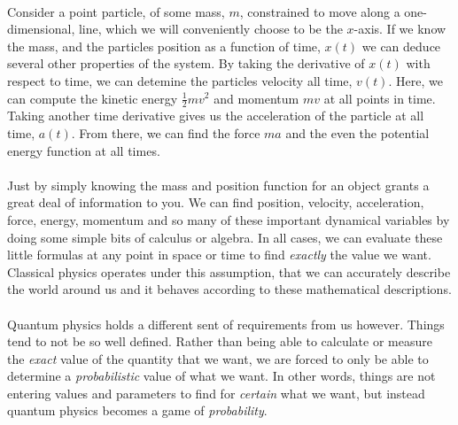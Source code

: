 \documentclass[12pt,letterpaper]{book}
\begin{document}

\paragraph*{}Consider a point particle, of some mass, $m$, constrained to move along a one-dimensional, line, which we will conveniently choose to be the $x$-axis. If we know the mass, and the particles position as a function of time, $x(t)$ we can deduce several other properties of the system. By taking the derivative of $x(t)$ with respect to time, we can detemine the particles velocity all time, $v(t)$. Here, we can compute the kinetic energy $\frac{1}{2}mv^2$ and momentum $mv$ at all points in time. Taking another time derivative gives us the acceleration of the particle at all time, $a(t)$. From there, we can find the force $ma$ and the even the potential energy function at all times. 
\paragraph*{}Just by simply knowing the mass and position function for an object grants a great deal of information to you. We can find position, velocity, acceleration, force, energy, momentum and so many of these important dynamical variables by doing some simple bits of calculus or algebra. In all cases, we can evaluate these little formulas at any point in space or time to find \textit{exactly} the value we want. Classical physics operates under this assumption, that we can accurately describe the world around us and it behaves according to these mathematical descriptions.
\paragraph*{}Quantum physics holds a different sent of requirements from us however. Things tend to not be so well defined. Rather than being able to calculate or measure the \textit{exact} value of the quantity that we want, we are forced to only be able to determine a \textit{probabilistic} value of what we want. In other words, things are not entering values and parameters to find for \textit{certain} what we want, but instead quantum physics becomes a game of \textit{probability}.
\end{document}
